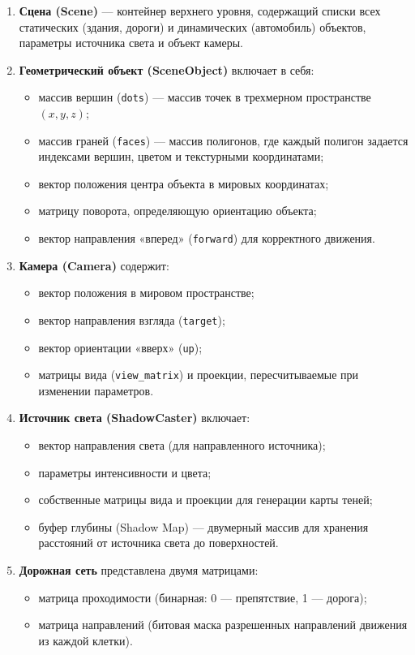 \begin{enumerate}
	\item \textbf{Сцена (Scene)} — контейнер верхнего уровня, содержащий списки всех статических (здания, дороги) и динамических (автомобиль) объектов, параметры источника света и объект камеры.
	
	\item \textbf{Геометрический объект (SceneObject)} включает в себя:
	\begin{itemize}
		\item массив вершин (\texttt{dots}) — массив точек в трехмерном пространстве $(x, y, z)$;
		\item массив граней (\texttt{faces}) — массив полигонов, где каждый полигон задается индексами вершин, цветом и текстурными координатами;
		\item вектор положения центра объекта в мировых координатах;
		\item матрицу поворота, определяющую ориентацию объекта;
		\item вектор направления «вперед» (\texttt{forward}) для корректного движения.
	\end{itemize}
	
	\item \textbf{Камера (Camera)} содержит:
	\begin{itemize}
		\item вектор положения в мировом пространстве;
		\item вектор направления взгляда (\texttt{target});
		\item вектор ориентации «вверх» (\texttt{up});
		\item матрицы вида (\texttt{view\_matrix}) и проекции, пересчитываемые при изменении параметров.
	\end{itemize}
	
	\item \textbf{Источник света (ShadowCaster)} включает:
	\begin{itemize}
		\item вектор направления света (для направленного источника);
		\item параметры интенсивности и цвета;
		\item собственные матрицы вида и проекции для генерации карты теней;
		\item буфер глубины (Shadow Map) — двумерный массив для хранения расстояний от источника света до поверхностей.
	\end{itemize}
	
	\item \textbf{Дорожная сеть} представлена двумя матрицами:
	\begin{itemize}
		\item матрица проходимости (бинарная: 0 — препятствие, 1 — дорога);
		\item матрица направлений (битовая маска разрешенных направлений движения из каждой клетки).
	\end{itemize}
\end{enumerate}

